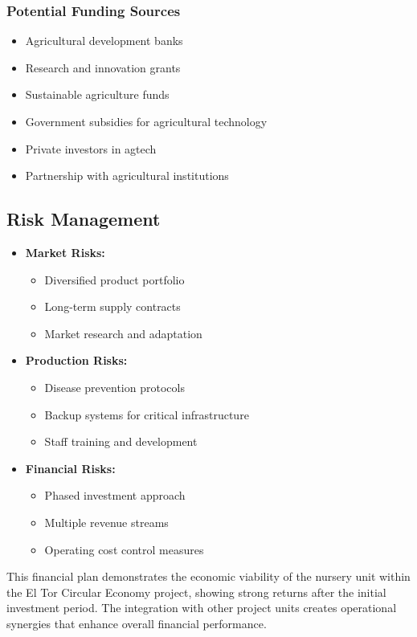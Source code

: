 \subsubsection{Potential Funding Sources}
\begin{itemize}
    \item Agricultural development banks
    \item Research and innovation grants
    \item Sustainable agriculture funds
    \item Government subsidies for agricultural technology
    \item Private investors in agtech
    \item Partnership with agricultural institutions
\end{itemize}

\subsection{Risk Management}
\begin{itemize}
    \item \textbf{Market Risks:}
    \begin{itemize}
        \item Diversified product portfolio
        \item Long-term supply contracts
        \item Market research and adaptation
    \end{itemize}
    
    \item \textbf{Production Risks:}
    \begin{itemize}
        \item Disease prevention protocols
        \item Backup systems for critical infrastructure
        \item Staff training and development
    \end{itemize}
    
    \item \textbf{Financial Risks:}
    \begin{itemize}
        \item Phased investment approach
        \item Multiple revenue streams
        \item Operating cost control measures
    \end{itemize}
\end{itemize}

This financial plan demonstrates the economic viability of the nursery unit within the El Tor Circular Economy project, showing strong returns after the initial investment period. The integration with other project units creates operational synergies that enhance overall financial performance. 